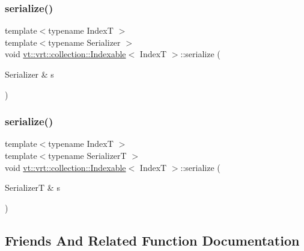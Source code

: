 \subsubsection{\texorpdfstring{serialize()}{serialize()}\hspace{0.1cm}{\footnotesize\ttfamily [1/2]}}
{\footnotesize\ttfamily template$<$typename IndexT $>$ \\
template$<$typename Serializer $>$ \\
void \hyperlink{structvt_1_1vrt_1_1collection_1_1_indexable}{vt\+::vrt\+::collection\+::\+Indexable}$<$ IndexT $>$\+::serialize (\begin{DoxyParamCaption}\item[{Serializer \&}]{s }\end{DoxyParamCaption})\hspace{0.3cm}{\ttfamily [protected]}}

\mbox{\label{structvt_1_1vrt_1_1collection_1_1_indexable_adadd30272517d10e6124a65edc48fb65}} 
\subsubsection{\texorpdfstring{serialize()}{serialize()}\hspace{0.1cm}{\footnotesize\ttfamily [2/2]}}
{\footnotesize\ttfamily template$<$typename IndexT $>$ \\
template$<$typename SerializerT $>$ \\
void \hyperlink{structvt_1_1vrt_1_1collection_1_1_indexable}{vt\+::vrt\+::collection\+::\+Indexable}$<$ IndexT $>$\+::serialize (\begin{DoxyParamCaption}\item[{SerializerT \&}]{s }\end{DoxyParamCaption})}



\subsection{Friends And Related Function Documentation}
\mbox{\label{structvt_1_1vrt_1_1collection_1_1_indexable_abb4eb03ec2c75b459ceec69021d22a2b}} 
